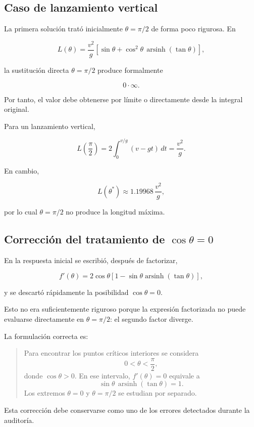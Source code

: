 \subsection{Caso de lanzamiento vertical}

La primera solución trató inicialmente \(\theta=\pi/2\) de forma poco rigurosa. En

\[
L(\theta)
=
\frac{v^2}{g}
\left[
\sin\theta+
\cos^2\theta\,
\operatorname{arsinh}(\tan\theta)
\right],
\]

la sustitución directa \(\theta=\pi/2\) produce formalmente

\[
0\cdot\infty.
\]

Por tanto, el valor debe obtenerse por límite o directamente desde la integral original.

Para un lanzamiento vertical,

\[
L\left(\frac{\pi}{2}\right)
=
2\int_0^{v/g}(v-gt)\,dt
=
\frac{v^2}{g}.
\]

En cambio,

\[
L(\theta^*)
\approx
1.19968\,\frac{v^2}{g},
\]

por lo cual \(\theta=\pi/2\) no produce la longitud máxima.

\subsection{Corrección del tratamiento de \(\cos\theta=0\)}

En la respuesta inicial se escribió, después de factorizar,

\[
f'(\theta)
=
2\cos\theta
\left[
1-\sin\theta\operatorname{arsinh}(\tan\theta)
\right],
\]

y se descartó rápidamente la posibilidad \(\cos\theta=0\).

Esto no era suficientemente riguroso porque la expresión factorizada no puede evaluarse directamente en \(\theta=\pi/2\): el segundo factor diverge.

La formulación correcta es:

\begin{quote}
Para encontrar los puntos críticos interiores se considera
\[
0<\theta<\frac{\pi}{2},
\]
donde \(\cos\theta>0\). En ese intervalo, \(f'(\theta)=0\) equivale a
\[
\sin\theta\,\operatorname{arsinh}(\tan\theta)=1.
\]
Los extremos \(\theta=0\) y \(\theta=\pi/2\) se estudian por separado.
\end{quote}

Esta corrección debe conservarse como uno de los errores detectados durante la auditoría.

